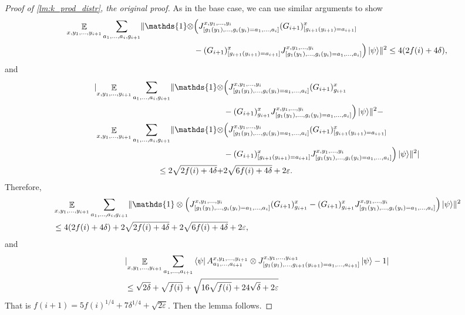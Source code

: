 \documentclass[10pt,a4paper]{article}
\theoremstyle{plain}
\theoremstyle{definition}
\DeclarePairedDelimiter{\norm}{\lVert}{\rVert}
\DeclarePairedDelimiter{\abs}{\lvert}{\rvert}
\newcommand {\bra} [1] {\ensuremath{ \left\langle #1 \right| }}
\newcommand {\ket} [1] {\ensuremath{ \left| #1 \right\rangle }}
\DeclareMathOperator*{\bigE}{\mathbb{E}}
\newcommand {\id} {\ensuremath{\mathds{1}}}
\newcommand{\ep} {\ensuremath{\varepsilon}}
\newcommand{\x}{\otimes}
\newcommand{\1}{\mathbb{1}} %
\begin{document}
\begin{proof}[Proof of \cref{lm:k_prod_distr}, the original proof]
	As in the base case, we can use similar arguments to show
	\begin{align*}
		\bigE_{x,y_1,\ldots,y_{i+1}} \sum_{a_1,\ldots,a_i, g_{i+1}} \norm{ \id \x &\Big( J_{[g_1(y_1),\ldots,g_{i}(y_{i}) = a_1, \ldots,a_{i}]}^{x,y_1,\ldots,y_i}(G_{i+1})^x_{[g_{i+1}(y_{i+1}) = a_{i+1}]} \\
		&- (G_{i+1})^x_{[g_{i+1}(y_{i+1})=a_{i+1}]}   J_{[g_1(y_1),\ldots,g_{i}(y_{i}) = a_1, \ldots,a_{i}]}^{x,y_1,\ldots,y_i} \Big) \ket{\psi}}^2
		\leq 4(2f(i) + 4 \delta),
	\end{align*}
	and 
	\begin{align*}
		\abs{ \bigE_{x,y_1,\ldots,y_{i+1}} \sum_{a_1,\ldots,a_i, g_{i+1}} \norm{ \id \x &\Big( J_{[g_1(y_1),\ldots,g_{i}(y_{i}) = a_1, \ldots,a_{i}]}^{x,y_1,\ldots,y_i}(G_{i+1})^x_{g_{i+1}} \\
		 &- (G_{i+1})^x_{g_{i+1}} J_{[g_1(y_1),\ldots,g_{i}(y_{i}) = a_1, \ldots,a_{i}]}^{x,y_1,\ldots,y_i} \Big) \ket{\psi}}^2
		-  \\
		\bigE_{x,y_1,\ldots,y_{i+1}} \sum_{a_1,\ldots,a_i, g_{i+1}} \norm{ \id \x &\Big( J_{[g_1(y_1),\ldots,g_{i}(y_{i}) = a_1, \ldots,a_{i}]}^{x,y_1,\ldots,y_i}(G_{i+1})^x_{[g_{i+1}(y_{i+1}) = a_{i+1}]} \\
		&- (G_{i+1})^x_{[g_{i+1}(y_{i+1})=a_{i+1}]}   J_{[g_1(y_1),\ldots,g_{i}(y_{i}) = a_1, \ldots,a_{i}]}^{x,y_1,\ldots,y_i} \Big) \ket{\psi}}^2} \\
		\leq 2 \sqrt{2f(i) + 4 \delta} + &2 \sqrt{6f(i) + 4\delta} + 2\ep.
	\end{align*}
	Therefore,
	\begin{align*}
		&\bigE_{x,y_1,\ldots,y_{i+1}} \sum_{a_1,\ldots,a_i, g_{i+1}} \norm{ \id \x \Big( J_{[g_1(y_1),\ldots,g_{i}(y_{i}) = a_1, \ldots,a_{i}]}^{x,y_1,\ldots,y_i}(G_{i+1})^x_{g_{i+1}} - (G_{i+1})^x_{g_{i+1}} J_{[g_1(y_1),\ldots,g_{i}(y_{i}) = a_1, \ldots,a_{i}]}^{x,y_1,\ldots,y_i} \Big) \ket{\psi}}^2 \\
		&\leq 4(2f(i) + 4 \delta) + 2 \sqrt{2f(i) + 4 \delta} + 2 \sqrt{6f(i) + 4\delta} + 2\ep,
	\end{align*}
	and
	\begin{align*}
		&\abs{ \bigE_{x,y_1,\ldots,y_{i+1}} \sum_{a_1,\ldots, a_{i+1}} \bra{\psi} A^{x,y_1,\ldots,y_{i+1}}_{a_1,\ldots,a_{i+1}} \x J^{x,y_1,\ldots,y_{i+1}}_{[g_1(y_1),\ldots,g_{i+1}(y_{i+1}) = a_1, \ldots,a_{i+1}]} \ket{\psi} -1} \\
		&\leq \sqrt{2\delta} + \sqrt{f(i)} + \sqrt{16\sqrt{f(i)} + 24 \sqrt{\delta} + 2\ep }
	\end{align*}
	That is $f(i+1) = 5f(i)^{1/4}  + 7 \delta^{1/4} + \sqrt{2\ep}$. Then the lemma follows.
\end{proof}
%
\end{document}
